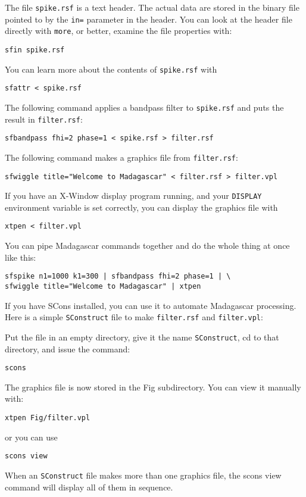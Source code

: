 The file \texttt{spike.rsf} is a text header. The actual data are stored in the
binary file pointed to by the \texttt{in=} parameter in the header. You can look
at the header file directly with \texttt{more}, or better, examine the file
properties with:
\begin{verbatim}
sfin spike.rsf
\end{verbatim}
You can learn more about the contents of \texttt{spike.rsf} with
\begin{verbatim}
sfattr < spike.rsf
\end{verbatim}
The following command applies a bandpass filter to \texttt{spike.rsf} and puts the result
in \texttt{filter.rsf}:
\begin{verbatim}
sfbandpass fhi=2 phase=1 < spike.rsf > filter.rsf
\end{verbatim}
The following command makes a graphics file from \texttt{filter.rsf}:
\begin{verbatim}
sfwiggle title="Welcome to Madagascar" < filter.rsf > filter.vpl
\end{verbatim}
If you have an X-Window display program running, and your \texttt{DISPLAY}
environment variable is set correctly, you can display the graphics file
with
\begin{verbatim}
xtpen < filter.vpl
\end{verbatim}
You can pipe Madagascar commands together and do the whole thing at once
like this:
\begin{verbatim}
sfspike n1=1000 k1=300 | sfbandpass fhi=2 phase=1 | \
sfwiggle title="Welcome to Madagascar" | xtpen
\end{verbatim}
If you have SCons installed, you can use it to automate Madagascar
processing. Here is a simple \texttt{SConstruct} file to make \texttt{filter.rsf} and
\texttt{filter.vpl}:


Put the file in an empty directory, give it the name \texttt{SConstruct}, cd to
that directory, and issue the command:
\begin{verbatim}
scons
\end{verbatim}
The graphics file is now stored in the Fig subdirectory. You can view it
manually with:
\begin{verbatim}
xtpen Fig/filter.vpl
\end{verbatim}
or you can use
\begin{verbatim}
scons view
\end{verbatim}
When an \texttt{SConstruct} file makes more than one graphics file, the scons
view command will display all of them in sequence.

